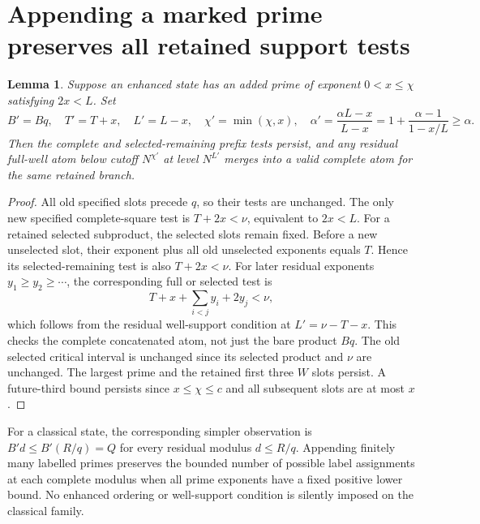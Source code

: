 \documentclass[11pt]{article}
\newtheorem{lemma}[proposition]{Lemma}
\begin{document}
\section{Appending a marked prime preserves all retained support tests}
\begin{lemma}\label{lem:append}
Suppose an enhanced state has an added prime of exponent
$0<x\le\chi$ satisfying $2x<L$. Set
\[
 B'=Bq,\quad T'=T+x,\quad L'=L-x,\quad
 \chi'=\min(\chi,x),\quad
 \alpha'=\frac{\alpha L-x}{L-x}
           =1+\frac{\alpha-1}{1-x/L}\ge\alpha.
\]
Then the complete and selected-remaining prefix tests persist, and any
residual full-well atom below cutoff $N^{\chi'}$ at level $N^{L'}$
merges into a valid complete atom for the same retained branch.
\end{lemma}
\begin{proof}
All old specified slots precede $q$, so their tests are unchanged.
The only new specified complete-square test is $T+2x<\nu$,
equivalent to $2x<L$. For a retained selected subproduct, the selected
slots remain fixed. Before a new unselected slot, their exponent plus
all old unselected exponents equals $T$. Hence its selected-remaining
test is also $T+2x<\nu$. For later residual exponents
$y_1\ge y_2\ge\cdots$, the corresponding full or selected test is
\[
 T+x+\sum_{i<j}y_i+2y_j<\nu,
\]
which follows from the residual well-support condition at $L'=\nu-T-x$.
This checks the complete concatenated atom, not just the bare product
$Bq$. The old selected critical interval is unchanged since its selected
product and $\nu$ are unchanged. The largest prime and the retained
first three $W$ slots persist. A future-third bound persists since
$x\le\chi\le c$ and all subsequent slots are at most $x$.
\end{proof}

For a classical state, the corresponding simpler observation is
$B' d\le B'(R/q)=Q$ for every residual modulus $d\le R/q$.
Appending finitely many labelled primes preserves the bounded number
of possible label assignments at each complete modulus when all prime
exponents have a fixed positive lower bound. No enhanced ordering or
well-support condition is silently imposed on the classical family.
\end{document}
